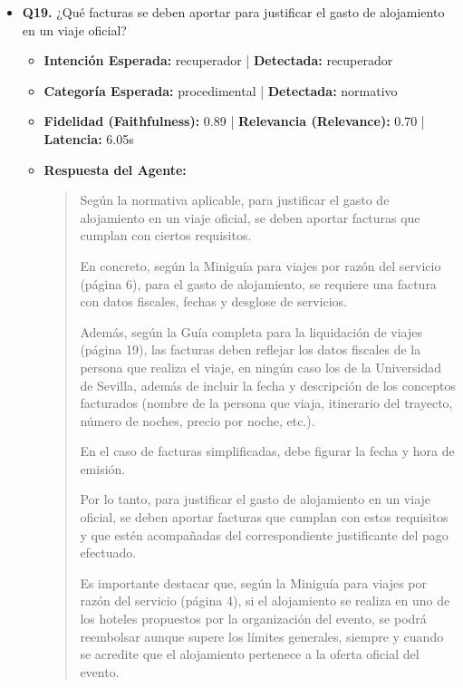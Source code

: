\documentclass[12pt,a4paper,oneside]{report}
\begin{document}
\begin{itemize}
  
\item \textbf{Q19.} ¿Qué facturas se deben aportar para justificar el gasto de alojamiento en un viaje oficial? \\
        \begin{itemize}
          \item \textbf{Intención Esperada:} recuperador | \textbf{Detectada:} recuperador
          \item \textbf{Categoría Esperada:} procedimental | \textbf{Detectada:} normativo
          \item \textbf{Fidelidad (Faithfulness):} 0.89 | \textbf{Relevancia (Relevance):} 0.70 | \textbf{Latencia:} 6.05s
          \item \textbf{{Respuesta del Agente:}} \\
                \begin{quote}
Según la normativa aplicable, para justificar el gasto de alojamiento en un viaje oficial, se deben aportar facturas que cumplan con ciertos requisitos. 

En concreto, según la Miniguía para viajes por razón del servicio (página 6), para el gasto de alojamiento, se requiere una factura con datos fiscales, fechas y desglose de servicios. 

Además, según la Guía completa para la liquidación de viajes (página 19), las facturas deben reflejar los datos fiscales de la persona que realiza el viaje, en ningún caso los de la Universidad de Sevilla, además de incluir la fecha y descripción de los conceptos facturados (nombre de la persona que viaja, itinerario del trayecto, número de noches, precio por noche, etc.). 

En el caso de facturas simplificadas, debe figurar la fecha y hora de emisión. 

Por lo tanto, para justificar el gasto de alojamiento en un viaje oficial, se deben aportar facturas que cumplan con estos requisitos y que estén acompañadas del correspondiente justificante del pago efectuado. 

Es importante destacar que, según la Miniguía para viajes por razón del servicio (página 4), si el alojamiento se realiza en uno de los hoteles propuestos por la organización del evento, se podrá reembolsar aunque supere los límites generales, siempre y cuando se acredite que el alojamiento pertenece a la oferta oficial del evento. 


\end{quote}
\end{itemize}
\end{itemize}
\end{document}
